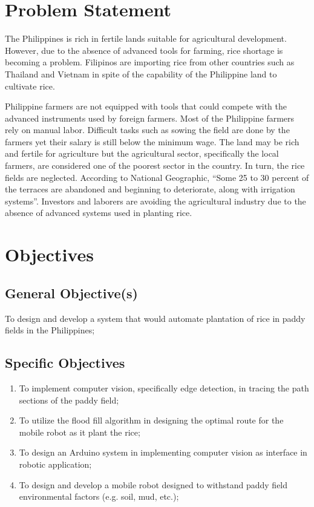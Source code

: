 \section{Problem Statement}
The Philippines is rich in fertile lands suitable for agricultural development. However, due to the absence of advanced tools for farming, rice shortage is becoming a problem. Filipinos are importing rice from other countries such as Thailand and Vietnam in spite of the capability of the Philippine land to cultivate rice.
 
Philippine farmers are not equipped with tools that could compete with the advanced instruments used by foreign farmers. Most of the Philippine farmers rely on manual labor. Difficult tasks such as sowing the field are done by the farmers yet their salary is still below the minimum wage. The land may be rich and fertile for agriculture but the agricultural sector, specifically the local farmers, are considered one of the poorest sector in the country. In turn, the rice fields are neglected. According to National Geographic, “Some 25 to 30 percent of the terraces are abandoned and beginning to deteriorate, along with irrigation systems”. Investors and laborers are avoiding the agricultural industry due to the absence of advanced systems used in planting rice.
 
\section{Objectives}
\subsection{General Objective(s)}
To design and develop a system that would automate plantation of rice in paddy fields in the Philippines;
 
\subsection{Specific Objectives}
 
\begin{enumerate}
\item To implement computer vision, specifically edge detection, in tracing the path sections of the paddy field;
 
\item To utilize the flood fill algorithm in designing the optimal route for the mobile robot as it plant the rice;
 
\item To design an Arduino system in implementing computer vision as interface in robotic application;
 
\item To design and develop a mobile robot designed to withstand paddy field environmental factors (e.g. soil, mud, etc.);
 
\end{enumerate}
 
